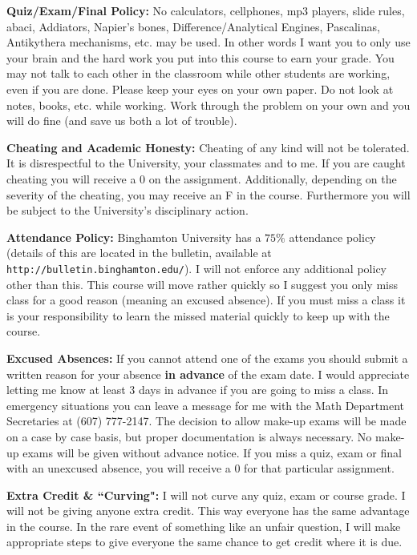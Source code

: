 \documentclass[12pt]{article}
\begin{document}
{\bf Quiz/Exam/Final Policy:}
No calculators, cellphones, mp3 players, slide rules, abaci, Addiators, Napier's bones, Difference/Analytical Engines, Pascalinas, Antikythera mechanisms, etc. may be used.  In other words I want you to only use your brain and the hard work you put into this course to earn your grade.  You may not talk to each other in the classroom while other students are working, even if you are done.  Please keep your eyes on your own paper.  Do not look at notes, books, etc. while working. Work through the problem on your own and you will do fine (and save us both a lot of trouble).  

{\bf Cheating and Academic Honesty:}
Cheating of any kind will not be tolerated. It is disrespectful to the University, your classmates and to me.  If you are caught cheating you will receive a 0 on the assignment. Additionally, depending on the severity of the cheating, you may receive an F in the course. Furthermore you will be subject to the University's disciplinary action.

{\bf Attendance Policy:}
Binghamton University has a $75\%$ attendance policy (details of this are located in the bulletin, available at {\tt http://bulletin.binghamton.edu/}).  I will not enforce any additional policy other than this. This course will move rather quickly so I suggest you only miss class for a good reason (meaning an excused absence).  If you must miss a class it is your responsibility to learn the missed material quickly to keep up with the course. 

{\bf Excused Absences:}
If you cannot attend one of the exams you should submit a written reason for your absence {\bf in advance} of the exam date.   I would appreciate letting me know at least 3 days in advance if you are going to miss a class.  In emergency situations you can leave a message for me with the Math Department Secretaries at (607) 777-2147.   The decision to allow make-up exams will be made on a case by case basis, but proper documentation is always necessary. No make-up exams will be given without advance notice.  If you miss a quiz, exam or final with an unexcused absence, you will receive a 0 for that particular assignment. 


{\bf Extra Credit \& ``Curving":}
	I will not curve any quiz, exam or course grade.  I will not be giving anyone extra credit.  This way everyone has the same advantage in the course.  In the rare event of something like an unfair question, I will make appropriate steps to give everyone the same chance to get  credit where it is due.   \\ 
\end{document}
